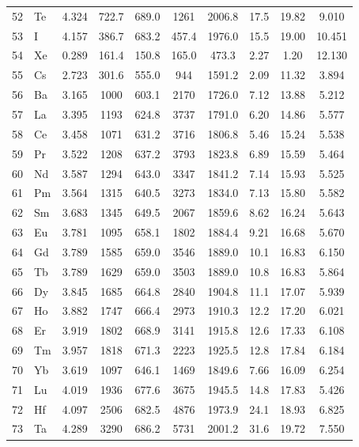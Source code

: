 \documentclass[12pt,a4paper]{article}
\theoremstyle{remark}
\begin{document}
\begin{longtable}{@{}llcccccccc@{}}
		52 & Te  & 4.324 & 722.7  & 689.0  & 1261   & 2006.8 & 17.5  & 19.82 & 9.010 \\
		53 & I   & 4.157 & 386.7  & 683.2  & 457.4  & 1976.0 & 15.5  & 19.00 & 10.451 \\
		54 & Xe  & 0.289 & 161.4  & 150.8  & 165.0  & 473.3  & 2.27  & 1.20  & 12.130 \\
		55 & Cs  & 2.723 & 301.6  & 555.0  & 944    & 1591.2 & 2.09  & 11.32 & 3.894 \\
		56 & Ba  & 3.165 & 1000   & 603.1  & 2170   & 1726.0 & 7.12  & 13.88 & 5.212 \\
		57 & La  & 3.395 & 1193   & 624.8  & 3737   & 1791.0 & 6.20  & 14.86 & 5.577 \\
		58 & Ce  & 3.458 & 1071   & 631.2  & 3716   & 1806.8 & 5.46  & 15.24 & 5.538 \\
		59 & Pr  & 3.522 & 1208   & 637.2  & 3793   & 1823.8 & 6.89  & 15.59 & 5.464 \\
		60 & Nd  & 3.587 & 1294   & 643.0  & 3347   & 1841.2 & 7.14  & 15.93 & 5.525 \\
		61 & Pm  & 3.564 & 1315   & 640.5  & 3273   & 1834.0 & 7.13  & 15.80 & 5.582 \\
		62 & Sm  & 3.683 & 1345   & 649.5  & 2067   & 1859.6 & 8.62  & 16.24 & 5.643 \\
		63 & Eu  & 3.781 & 1095   & 658.1  & 1802   & 1884.4 & 9.21  & 16.68 & 5.670 \\
		64 & Gd  & 3.789 & 1585   & 659.0  & 3546   & 1889.0 & 10.1  & 16.83 & 6.150 \\
		65 & Tb  & 3.789 & 1629   & 659.0  & 3503   & 1889.0 & 10.8  & 16.83 & 5.864 \\
		66 & Dy  & 3.845 & 1685   & 664.8  & 2840   & 1904.8 & 11.1  & 17.07 & 5.939 \\
		67 & Ho  & 3.882 & 1747   & 666.4  & 2973   & 1910.3 & 12.2  & 17.20 & 6.021 \\
		68 & Er  & 3.919 & 1802   & 668.9  & 3141   & 1915.8 & 12.6  & 17.33 & 6.108 \\
		69 & Tm  & 3.957 & 1818   & 671.3  & 2223   & 1925.5 & 12.8  & 17.84 & 6.184 \\
		70 & Yb  & 3.619 & 1097   & 646.1  & 1469   & 1849.6 & 7.66  & 16.09 & 6.254 \\
		71 & Lu  & 4.019 & 1936   & 677.6  & 3675   & 1945.5 & 14.8  & 17.83 & 5.426 \\
		72 & Hf  & 4.097 & 2506   & 682.5  & 4876   & 1973.9 & 24.1  & 18.93 & 6.825 \\
		73 & Ta  & 4.289 & 3290   & 686.2  & 5731   & 2001.2 & 31.6  & 19.72 & 7.550 \\

\end{longtable}
\end{document}
